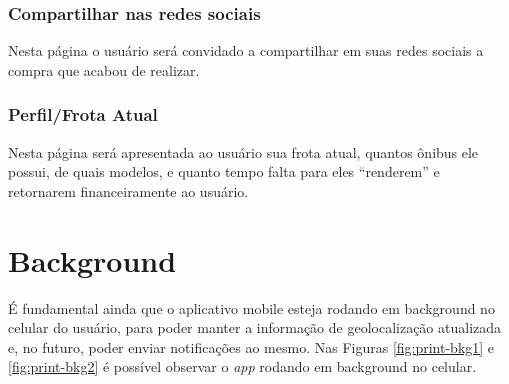\subsubsection{Compartilhar nas redes sociais}
Nesta página o usuário será convidado a compartilhar em suas redes sociais a compra que acabou de realizar.
    
\subsubsection{Perfil/Frota Atual}
Nesta página será apresentada ao usuário sua frota atual, quantos ônibus ele possui, de quais modelos, e quanto tempo falta para eles ``renderem'' e retornarem financeiramente ao usuário.

\section{Background}
É fundamental ainda que o aplicativo mobile esteja rodando em background no celular do usuário, para poder manter a informação de geolocalização atualizada e, no futuro, poder enviar notificações ao mesmo. Nas Figuras \ref{fig:print-bkg1} e \ref{fig:print-bkg2} é possível observar o \textit{app} rodando em background no celular.



